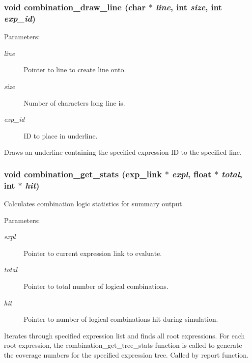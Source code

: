 \subsubsection{\setlength{\rightskip}{0pt plus 5cm}void combination\_\-draw\_\-line (char $\ast$ {\em line}, int {\em size}, int {\em exp\_\-id})}\label{comb_8c_a10}


\begin{Desc}
\item[Parameters: ]\par
\begin{description}
\item[{\em 
line}]Pointer to line to create line onto. \item[{\em 
size}]Number of characters long line is. \item[{\em 
exp\_\-id}]ID to place in underline.\end{description}
\end{Desc}
Draws an underline containing the specified expression ID to the specified line. 
\subsubsection{\setlength{\rightskip}{0pt plus 5cm}void combination\_\-get\_\-stats ({\bf exp\_\-link} $\ast$ {\em expl}, float $\ast$ {\em total}, int $\ast$ {\em hit})}\label{comb_8c_a7}


Calculates combination logic statistics for summary output.

\begin{Desc}
\item[Parameters: ]\par
\begin{description}
\item[{\em 
expl}]Pointer to current expression link to evaluate. \item[{\em 
total}]Pointer to total number of logical combinations. \item[{\em 
hit}]Pointer to number of logical combinations hit during simulation.\end{description}
\end{Desc}
Iterates through specified expression list and finds all root expressions. For each root expression, the combination\_\-get\_\-tree\_\-stats function is called to generate the coverage numbers for the specified expression tree. Called by report function. 

